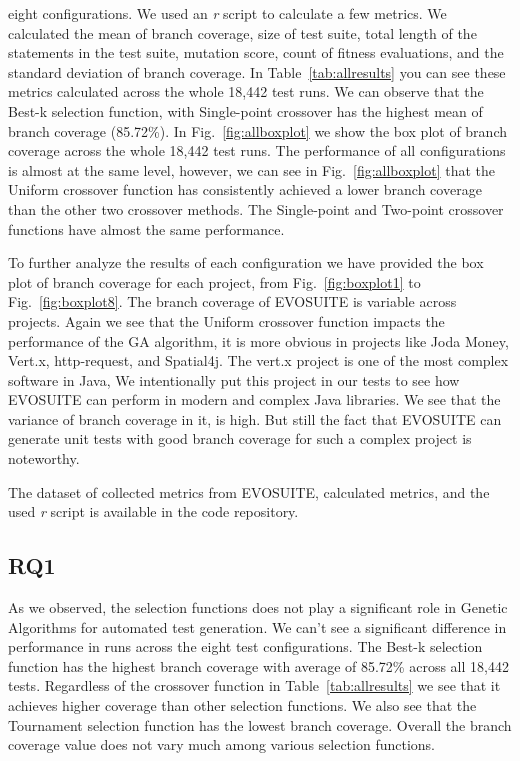 \documentclass[sigconf]{acmart}
\begin{document}
eight configurations.
We used an \textit{r} script to calculate a few metrics. We calculated the mean of branch coverage, size of test suite, 
total length of the statements in the test suite, mutation score, count of fitness evaluations, 
and the standard deviation of branch coverage. In Table~\ref{tab:allresults} you can see these metrics calculated 
across the whole 18,442 test runs. We can observe that the Best-k selection function, with  
Single-point crossover has the highest mean of branch coverage (85.72\%). 
In Fig.~\ref{fig:allboxplot} we show the box plot of branch coverage across the whole 18,442 test runs. 
The performance of all configurations is almost at the same level, however, we can see in 
Fig.~\ref{fig:allboxplot} that the Uniform crossover function has consistently achieved a 
lower branch coverage than the other two crossover methods. The Single-point and Two-point crossover 
functions have almost the same performance.

To further analyze the results of each configuration we have provided the box plot of branch coverage 
for each project, from Fig.~\ref{fig:boxplot1} to Fig.~\ref{fig:boxplot8}. The branch coverage 
of EVOSUITE is variable across projects. Again we see that the Uniform crossover function 
impacts the performance of the GA algorithm, it is more obvious in projects like Joda Money,
Vert.x, http-request, and Spatial4j. The vert.x project is one of the most complex software in Java, We 
intentionally put this project in our tests to see how EVOSUITE can perform in modern and complex Java 
libraries. We see that the variance of branch coverage in it, is high. But still the fact 
that EVOSUITE can generate unit tests with good branch coverage for such a complex project is noteworthy. 

The dataset of collected metrics from EVOSUITE, calculated metrics, and 
the used \textit{r} script is available in the code repository. 

\subsection{RQ1}
As we observed, the selection functions does not play a significant role in Genetic Algorithms for automated 
test generation. We can't see a significant difference in performance in runs across the eight test configurations.
The Best-k selection function has the highest branch coverage with average of 85.72\% across all 18,442 tests.
Regardless of the crossover function in Table~\ref{tab:allresults} we see that it achieves higher coverage than 
other selection functions. We also see that the Tournament selection function has the lowest branch coverage.
Overall the branch coverage value does not vary much among various selection functions.
\end{document}
